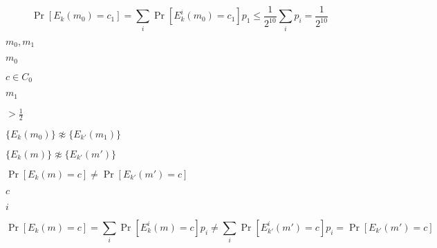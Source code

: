 \documentclass[10pt]{book}
\begin{document}
\begin{mdSnippets}
\begin{mdDisplaySnippet}
\[%
\Pr[E_k(m_0) = c_1] = \sum_i \Pr[E^i_k(m_0) = c_1] p_1 \leq \frac{1}{2^10} \sum_i p_i = \frac{1}{2^10}
\]%
\end{mdDisplaySnippet}%
\begin{mdInlineSnippet}[0b02be2105e9778833fb7fbd15244683]%
$m_0,m_1$\end{mdInlineSnippet}%
\begin{mdInlineSnippet}[fed1e4775925bd3f7af0c5d8fc47e4e6]%
$m_0$\end{mdInlineSnippet}%
\begin{mdInlineSnippet}[f60ab22314265c6d424232fb3cbb0fc7]%
$c \in C_0$\end{mdInlineSnippet}%
\begin{mdInlineSnippet}%
$m_1$\end{mdInlineSnippet}%
\begin{mdInlineSnippet}[ae7b1fad9dd5a16c565d57f74329ef51]%
$> \frac{1}{2}$\end{mdInlineSnippet}%
\begin{mdInlineSnippet}[fb62447339532c357ec52691c6aabe45]%
$\{ E_k(m_0) \} \not\approx \{E_{k'}(m_1) \}$\end{mdInlineSnippet}%
\begin{mdInlineSnippet}[9b2c89e17c4a50e6c7063b2c19925eb5]%
$\{E_k(m) \} \not\approx \{E_{k'}(m')\}$\end{mdInlineSnippet}%
\begin{mdInlineSnippet}[d52d4fe05d068e89a7b457a590615d45]%
$\Pr[E_k(m) = c] \neq \Pr[E_{k'}(m') = c]$\end{mdInlineSnippet}%
\begin{mdInlineSnippet}[4a8a08f09d37b73795649038408b5f33]%
$c$\end{mdInlineSnippet}%
\begin{mdInlineSnippet}[865c0c0b4ab0e063e5caa3387c1a8741]%
$i$\end{mdInlineSnippet}%
\begin{mdDisplaySnippet}[5294ef6d98f8f8ec7f609675511735bf]%
\[%
\Pr[E_k(m) = c] = \sum_i \Pr[E^i_k(m) = c] p_i \neq \sum_{i} \Pr[E^i_{k'}(m') = c] p_i = \Pr[E_{k'}(m') = c]
\]%
\end{mdDisplaySnippet}%

\end{mdSnippets}
\end{document}

